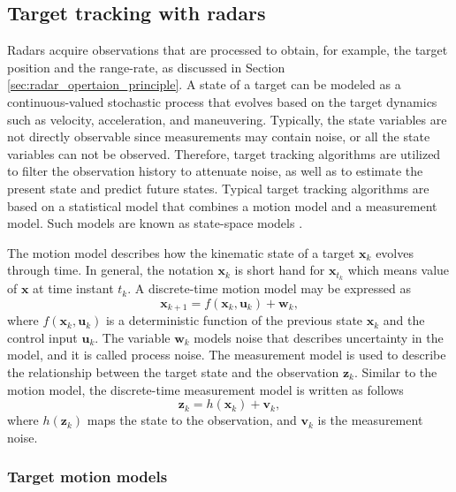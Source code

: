 \documentclass[english, 12pt, a4paper, elec, utf8, a-1b, online]{aaltothesis}
\renewcommand{\vec}[1]{\mathbf{#1}}
\newcommand{\x}{\vec{x}_k}
\newcommand{\xnext}{\vec{x}_{k+1}}
\newcommand{\z}{\vec{z}_k}
\newcommand{\cinput}{\vec{u}_k}
\newcommand{\pnoise}{\vec{w}_k}
\newcommand{\onoise}{\vec{v}_k}
\begin{document}
\subsection{Target tracking with radars} \label{sec:Tracking}

Radars acquire observations that are processed to obtain, for example, the target position and the range-rate, as discussed in Section \ref{sec:radar_opertaion_principle}.
A state of a target can be modeled as a continuous-valued stochastic process that evolves based on the target dynamics such as velocity, acceleration, and maneuvering. 
Typically, the state variables are not directly observable since measurements may contain noise, or all the state variables can not be observed.
Therefore, target tracking algorithms are utilized to filter the observation history to attenuate noise, as well as to estimate the present state and predict future states.
Typical target tracking algorithms are based on a statistical model that combines a motion model and a measurement model. 
Such models are known as state-space models \cite{RongLi2003}.

The motion model describes how the kinematic state of a target $\x$ evolves through time.
In general, the notation $\x$ is short hand for $\vec{x}_{t_k}$ which means value of $\vec{x}$ at time instant $t_k$. 
A discrete-time motion model may be expressed as \cite{RongLi2003}
\begin{equation}\label{eq:spm_motion}
    \xnext  = f(\x, \cinput) + \pnoise,
\end{equation}
where $f(\x, \cinput)$ is a deterministic function of the previous state $\x$ and the control input $\cinput$.
The variable $\pnoise$ models noise that describes uncertainty in the model, and it is called process noise.
The measurement model is used to describe the relationship between the target state and the observation $\z$. 
Similar to the motion model, the discrete-time measurement model is written as follows \cite{RongLi2003}
\begin{equation}\label{eq:spm_obs}
    \z = h(\x) + \onoise,
\end{equation}
where $h(\z)$ maps the state to the observation, and $\onoise$ is the measurement noise.

\subsubsection{Target motion models} \label{sec:target_models}
\end{document}

